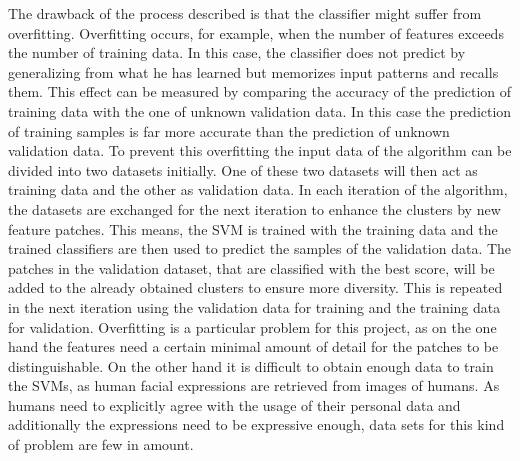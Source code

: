The drawback of the process described is that the classifier might suffer from overfitting. Overfitting occurs, for example, when the number of features exceeds the number of training data. In this case, the classifier does not predict by generalizing from what he has learned but memorizes input patterns and recalls them. This effect can be measured by comparing the accuracy of the prediction of training data with the one of unknown validation data. In this case the prediction of training samples is far more accurate than the prediction of unknown validation data. To prevent this overfitting the input data of the algorithm can be divided into two datasets initially. One of these two datasets will then act as training data and the other as validation data. In each iteration of the algorithm, the datasets are exchanged for the next iteration to enhance the clusters by new feature patches. This means, the SVM is trained with the training data and the trained classifiers are then used to predict the samples of the validation data. The patches in the validation dataset, that are classified with the best score, will be added to the already obtained clusters to ensure more diversity. This is repeated in the next iteration using the validation data for training and the training data for validation. Overfitting is a particular problem for this project, as on the one hand the features need a certain minimal amount of detail for the patches to be distinguishable. On the other hand it is difficult to obtain enough data to train the SVMs, as human facial expressions are retrieved from images of humans. As humans need to explicitly agree 
with the usage of their personal data and additionally the expressions need to be expressive enough, data sets for this kind of problem are few in amount.
